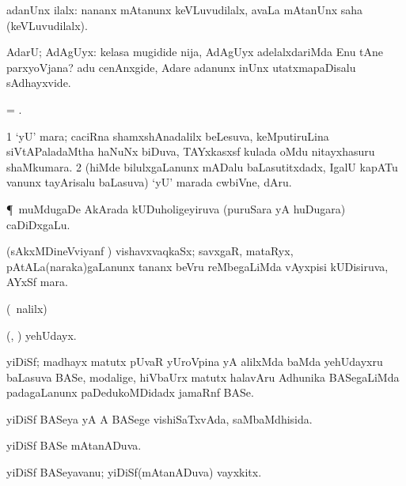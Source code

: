 \noindent
\gl{\pagu} 
\bmng
{} adanUnx ilalx:  nananx mAtanunx keVLuvudilalx, avaLa mAtanUnx saha (keVLuvudilalx).
\emng
\eentry

\bentry
{} 
\gl{\BAavayx} 
\bmng
AdarU; AdAgUyx:  kelasa mugidide nija,  AdAgUyx adelalxdariMda Enu tAne parxyoVjana?   adu cenAnxgide, Adare adanunx inUnx utatxmapaDisalu sAdhayxvide.
\emng
\eentry

\bentry
{} 
\gl{\nA} 
\bmng
 = .
\emng
\eentry

\bentry
{} 
\gl{\nA} 
\bmng
\bnum
\num{1} `yU' mara; caciRna shamxshAnadalilx beLesuva, keMputiruLina siVtAPaladaMtha haNuNx biDuva, TAYxkasxsf kulada oMdu nitayxhasuru shaMkumara. 
\num{2} (hiMde bilulxgaLanunx mADalu baLasutitxdadx, IgalU kapATu \mo vanunx tayArisalu baLasuva) `yU'  marada cwbiVne, dAru.
\enum
\emng
\eentry

\bentry
{} 
\gl{\nA}
\bmng
\P\ muMdugaDe   AkArada kUDuholigeyiruva (puruSara yA huDugara) caDiDxgaLu.
\emng
\eentry

\bentry
{} 
\gl{\nA}
\bmng
(sAkxMDineVviyanf \pu)  vishavxvaqkaSx; savxgaR, mataRyx, pAtALa(naraka)gaLanunx tananx  beVru reMbegaLiMda vAyxpisi kUDisiruva, AYxSf mara.
\emng
\eentry

\bentry
{}
\gl{\saMkiSx} 
\bmng
(\UK\ nalilx) 
\emng
\eentry

\bentry
{} 
\gl{\nA} 
\bmng
(\ashi, \hiV) yehUdayx.
\emng
\eentry

\bentry
{} 
\gl{\nA} 
\bmng
yiDiSf; madhayx matutx  pUvaR yUroVpina yA alilxMda baMda yehUdayxru baLasuva BASe, modalige,  hiVbaUrx matutx halavAru Adhunika BASegaLiMda padagaLanunx paDedukoMDidadx jamaRnf BASe.
\emng 
\eentry

\bentry
{} 
\gl{\gu} 
\bmng
yiDiSf BASeya yA A BASege vishiSaTxvAda, saMbaMdhisida.
\emng 
\eentry

\bentry
{} 
\gl{\gu} 
\bmng
yiDiSf BASe mAtanADuva.
\emng
\eentry

\bentry
{} 
\gl{\nA} 
\bmng
yiDiSf BASeyavanu; yiDiSf(mAtanADuva) vayxkitx.
\emng
\eentry

